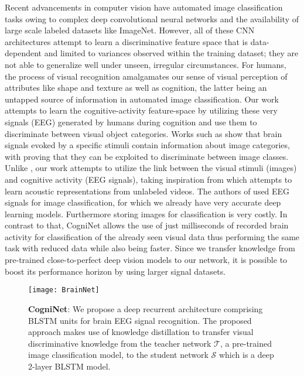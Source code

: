 \documentclass{article}
\begin{document}
Recent advancements in computer vision have automated image classification tasks owing to complex deep convolutional neural networks and the availability of large scale labeled datasets like ImageNet. However, all of these CNN architectures attempt to learn a discriminative feature space that is data-dependent and limited to variances observed within the training dataset; they are not able to generalize well under unseen, irregular circumstances.
For humans, the process of visual recognition amalgamates our sense of visual perception of attributes like shape and texture as well as cognition, the latter being an untapped source of information in automated image classification. Our work attempts to learn the cognitive-activity feature-space by utilizing these very signals (EEG) generated by humans during cognition and use them to discriminate between visual object categories. Works such as \cite{das2010predicting, wang2012combining, shenoy2008human, carlson2011high, carlson2013representational, kaneshiro2015representational, simanova2010identifying} show that brain signals evoked by a specific stimuli contain information about image categories, with \cite{spampinato2017deep} proving that they can be exploited to discriminate between image classes. Unlike \cite{spampinato2017deep}, our work attempts to utilize the link between the visual stimuli (images) and cognitive activity (EEG signals), taking inspiration from \cite{aytar2016soundnet} which attempts to learn acoustic representations from unlabeled videos. The authors of \cite{spampinato2017deep} used EEG signals for image classification, for which we already have very accurate deep learning models. Furthermore storing images for classification is very costly. In contrast to that, CogniNet allows the use of just milliseconds of recorded brain activity for classification of the already seen visual data thus performing the same task with reduced data while also being faster. Since we transfer knowledge from pre-trained close-to-perfect deep vision models to our network, it is possible to boost its performance horizon by using larger signal datasets. 
\begin{figure*}
    \centering
    \texttt{[image: BrainNet]}
    \caption{\textbf{CogniNet}: We propose a  deep recurrent architecture comprising BLSTM units for brain EEG signal recognition. The proposed approach makes use of knowledge distillation to transfer visual discriminative knowledge from the teacher network $\mathcal{T}$, a pre-trained image classification model, to the student network $\mathcal{S}$ which is a deep 2-layer BLSTM model.}
    \label{fig:my_label}
\end{figure*}
\end{document}
